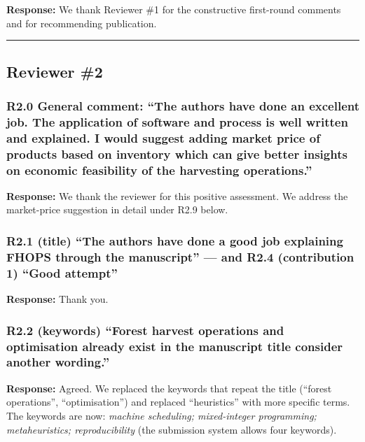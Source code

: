 \textbf{Response:} We thank Reviewer \#1 for the constructive
first-round comments and for recommending publication.

\begin{center}\rule{0.5\linewidth}{0.5pt}\end{center}

\subsection*{Reviewer \#2}\label{reviewer-2}

\subsubsection{R2.0 General comment: ``The authors have done an
excellent job. The application of software and process is well written
and explained. I would suggest adding market price of products based on
inventory which can give better insights on economic feasibility of the
harvesting
operations.''}\label{r2.0-general-comment-the-authors-have-done-an-excellent-job.-the-application-of-software-and-process-is-well-written-and-explained.-i-would-suggest-adding-market-price-of-products-based-on-inventory-which-can-give-better-insights-on-economic-feasibility-of-the-harvesting-operations.}

\textbf{Response:} We thank the reviewer for this positive assessment.
We address the market-price suggestion in detail under R2.9 below.

\subsubsection{R2.1 (title) ``The authors have done a good job
explaining FHOPS through the manuscript'' --- and R2.4 (contribution 1)
``Good
attempt''}\label{r2.1-title-the-authors-have-done-a-good-job-explaining-fhops-through-the-manuscript-and-r2.4-contribution-1-good-attempt}

\textbf{Response:} Thank you.

\subsubsection{R2.2 (keywords) ``Forest harvest operations and
optimisation already exist in the manuscript title consider another
wording.''}\label{r2.2-keywords-forest-harvest-operations-and-optimisation-already-exist-in-the-manuscript-title-consider-another-wording.}

\textbf{Response:} Agreed. We replaced the keywords that repeat the
title (``forest operations'', ``optimisation'') and replaced
``heuristics'' with more specific terms. The keywords are now:
\emph{machine scheduling; mixed-integer programming; metaheuristics;
reproducibility} (the submission system allows four keywords).

